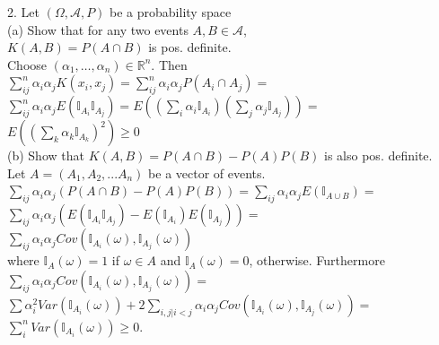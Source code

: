 \documentclass[18pt]{article}
\author{Adam Handwerger}
\begin{document}
\begin{flushleft}
2. Let $(\Omega,\mathcal{A}, P)$ be a probability space\\
\vspace{.4cm}
(a) Show that for any two events $A,B\in \mathcal{A}$,\\
$K(A,B)=P(A \cap B)$ is pos. definite.\\
\vspace{.4cm}
Choose $(\alpha_1,\dots,\alpha_n) \in \mathbb{R}^n$. Then\\
\vspace{.4cm}
$\sum_{ij}^n \alpha_i \alpha_j K(x_i,x_j)=\sum_{ij}^n \alpha_i \alpha_j P(A_i \cap A_j)=$\\
$\sum_{ij}^n \alpha_i \alpha_j E(\mathbb{I}_{A_i} \mathbb{I}_{A_j})=E\left( \left(\sum_i \alpha_i \mathbb{I}_{A_i}\right)\left(\sum_j \alpha_j \mathbb{I}_{A_j}\right)\right)=$\\
$E\left( \left(\sum_k \alpha_k \mathbb{I}_{A_k} \right)^2 \right) \geq 0$\\
\vspace{.4cm}
(b) Show that $K(A,B)=P(A \cap B)- P(A)P(B)$ is also pos. definite.\\
\vspace{.4cm}
Let $A=(A_1, A_2, ... A_n)$ be a vector of events.
$\sum_{ij} \alpha_i \alpha_j\left( P(A \cap B)- P(A)P(B)\right) =\sum_{ij} \alpha_i \alpha_j E(\mathbb{I}_{A \cup  B})=$\\
$\sum_{ij} \alpha_i \alpha_j \left(E(\mathbb{I}_{A_i} \mathbb{I}_{A_j} )- E(\mathbb{I}_{A_i}) E(\mathbb{I}_{A_j})\right)=$\\
$\sum_{ij} \alpha_i \alpha_j Cov \left(\mathbb{I}_{A_i}(\omega),\mathbb{I}_{A_j}(\omega)\right)$\\
\vspace{.4cm}
where $\mathbb{I}_{A}(\omega)=1$ if $\omega\in A$ and $\mathbb{I}_{A}(\omega)= 0$, otherwise. Furthermore\\
\vspace{.4cm}
$\sum_{ij} \alpha_i \alpha_j Cov \left(\mathbb{I}_{A_i}(\omega),\mathbb{I}_{A_j}(\omega)\right)=$\\
$\sum \alpha_i^2 Var(\mathbb{I}_{A_i}(\omega))+2 \sum_{i,j|i<j} \alpha_i \alpha_j Cov\left(\mathbb{I}_{A_i}(\omega),\mathbb{I}_{A_j}(\omega)\right)=$\\
$\sum_i^n Var(\mathbb{I}_{A_i}(\omega)) \geq 0$.

\vspace{.4cm}

\end{flushleft}
\end{document}
